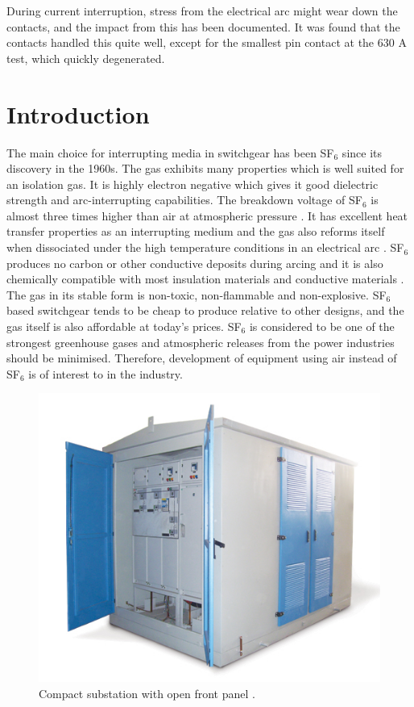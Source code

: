 \documentclass[10pt,a4paper,twoside]{article}
\begin{document}
During current interruption, stress from the electrical arc might wear down the contacts, and the impact from this has been documented. It was found that the contacts handled this quite well, except for the smallest pin contact at the 630 A test, which quickly degenerated.


\cleardoublepage
\setcounter{page}{1}
\tableofcontents
\cleardoublepage

\section{Introduction}
The main choice for interrupting media in switchgear has been SF$_6$ since its discovery in the 1960s. The gas exhibits many properties which is well suited for an isolation gas. It is highly electron negative which gives it good dielectric strength and arc-interrupting capabilities. The breakdown voltage of SF$_6$ is almost three times higher than air at atmospheric pressure \cite{bib:SF6PI}. It has excellent heat transfer properties as an interrupting medium and the gas also reforms itself when dissociated under the high temperature conditions in an electrical arc  \cite{bib:SF6PI}. SF$_6$ produces no carbon or other conductive deposits during arcing and it is also chemically compatible with most insulation materials and conductive materials \cite{bib:SF6PI}. The gas in its stable form is non-toxic, non-flammable and non-explosive. SF$_6$ based switchgear tends to be cheap to produce relative to other designs, and the gas itself is also affordable at today's prices. SF$_6$ is considered to be one of the strongest greenhouse gases and atmospheric releases from the power industries should be minimised. Therefore, development of equipment using air instead of SF$_6$ is of interest to in the industry.

\begin{figure} [h]
\centering
\includegraphics[scale=0.5]{Bilder/Introduction/general_substation.jpg}
\caption{Compact substation with open front panel \cite{bib:comSub}.} \label{fig:compact substation}
\end{figure}
\end{document}
